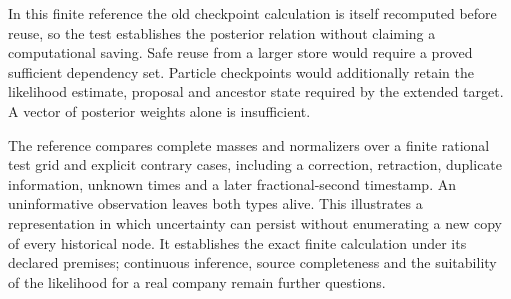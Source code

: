 In this finite reference the old checkpoint calculation is itself recomputed
before reuse, so the test establishes the posterior relation without claiming
a computational saving. Safe reuse from a larger store would require a proved
sufficient dependency set. Particle checkpoints would additionally retain the
likelihood estimate, proposal and ancestor state required by the extended
target. A vector of posterior weights alone is insufficient.

The reference compares complete masses and normalizers over a finite rational
test grid and explicit contrary cases, including a correction, retraction,
duplicate information, unknown times and a later fractional-second timestamp.
An uninformative observation leaves both types alive. This illustrates a
representation in which uncertainty can persist without enumerating a new
copy of every historical node. It establishes the exact finite calculation
under its declared premises; continuous inference, source completeness and
the suitability of the likelihood for a real company remain further questions.
